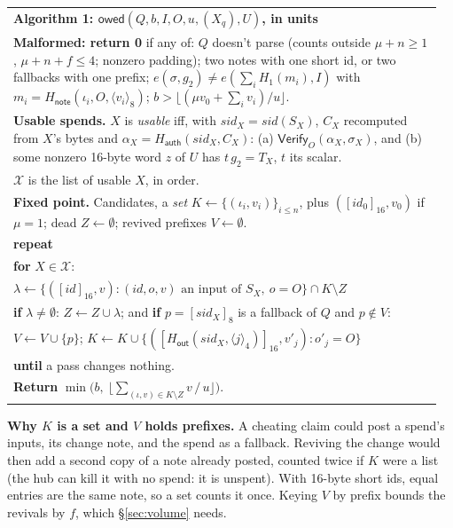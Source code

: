 \documentclass[11pt]{article}
\theoremstyle{plain}
\theoremstyle{definition}
\newcommand{\be}[2]{\langle #1\rangle_{#2}}
\newcommand{\pre}[2]{[#1]_{#2}}
\newcommand{\Ht}[1]{H_{\textsf{#1}}}
\newcommand{\Vfy}{\mathsf{Verify}}
\newcommand{\sid}{\mathit{sid}}
\newcommand{\owed}{\mathsf{owed}}
\newcommand{\Hg}{H_{1}}
\newenvironment{algobox}[1]
  {\par\smallskip\noindent\begin{tabular}{|p{0.955\linewidth}|}\hline\textbf{#1}\\[2pt]}
  {\\\hline\end{tabular}\par\smallskip}
\begin{document}
\begin{algobox}{Algorithm 1: $\owed(Q, b, I, O, u, (X_q), U)$, in units}
\textbf{Malformed: return 0} if any of:
$Q$ doesn't parse (counts outside $\mu + n \ge 1$, $\mu + n + f \le 4$; nonzero padding);
two notes with one short id, or two fallbacks with one prefix;
$e(\sigma, g_2) \ne e(\sum_i \Hg(m_i), I)$ with $m_i = \Ht{note}(\iota_i, O, \be{v_i}{8})$;
$b > \lfloor (\mu v_0 + \sum_i v_i) / u\rfloor$.\\[3pt]
\textbf{Usable spends.} $X$ is \emph{usable} iff, with $\sid_X = \sid(S_X)$,
$C_X$ recomputed from $X$'s bytes and $\alpha_X = \Ht{auth}(\sid_X, C_X)$:
\quad (a) $\Vfy_O(\alpha_X, \sigma_X)$, and
\quad (b) some nonzero 16-byte word $z$ of $U$ has $t\,g_2 = T_X$, $t$ its scalar.\\
$\mathcal{X}$ is the list of usable $X$, in order.\\[3pt]
\textbf{Fixed point.} Candidates, a \emph{set} $K \leftarrow \{(\iota_i, v_i)\}_{i \le n}$, plus $(\pre{\mathit{id}_0}{16}, v_0)$ if $\mu = 1$; dead $Z \leftarrow \emptyset$; revived prefixes $V \leftarrow \emptyset$.\\
\textbf{repeat}\\
\quad \textbf{for} $X \in \mathcal{X}$:\\
\quad\quad $\lambda \leftarrow \{(\pre{\mathit{id}}{16}, v) : (\mathit{id}, o, v) \text{ an input of } S_X,\ o = O\} \cap K \setminus Z$\\
\quad\quad \textbf{if} $\lambda \ne \emptyset$: $Z \leftarrow Z \cup \lambda$; and \textbf{if} $p = \pre{\sid_X}{8}$ is a fallback of $Q$ and $p \notin V$:\\
\quad\quad\quad $V \leftarrow V \cup \{p\}$; $K \leftarrow K \cup \{(\pre{\Ht{out}(\sid_X, \be{j}{4})}{16}, v'_j) : o'_j = O\}$\\
\textbf{until} a pass changes nothing.\\[3pt]
\textbf{Return} $\min\big(b,\ \big\lfloor \sum_{(\iota, v) \in K \setminus Z} v \,/\, u \big\rfloor\big)$.
\end{algobox}

\textbf{Why $K$ is a set and $V$ holds prefixes.} A cheating claim
could post a spend's inputs, its change note, and the spend as a
fallback. Reviving the change would then add a second copy of a note
already posted, counted twice if $K$ were a list (the hub can kill it
with no spend: it is unspent). With 16-byte short ids, equal entries are
the same note, so a set counts it once. Keying $V$ by prefix bounds the
revivals by $f$, which \S\ref{sec:volume} needs.
\end{document}
